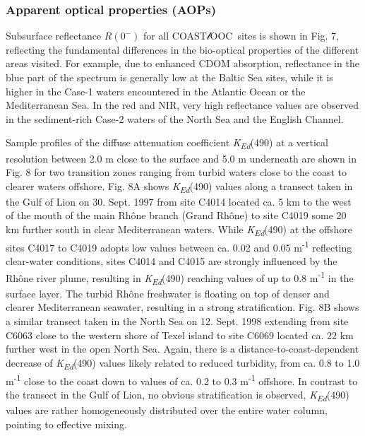\documentclass[essd, manuscript]{copernicus}
\newcommand{\coastlooc}{COAST$\mathscr{l}$OOC~\allowbreak}
\begin{document}
\subsubsection{Apparent optical properties (AOPs)}

Subsurface reflectance $R(0^-)$ for all \coastlooc sites is shown in Fig. 7, reflecting the fundamental differences in the bio-optical properties of the different areas visited. For example, due to enhanced CDOM absorption, reflectance in the blue part of the spectrum is generally low at the Baltic Sea sites, while it is higher in the Case-1 waters encountered in the Atlantic Ocean or the Mediterranean Sea. In the red and NIR, very high reflectance values are observed in the sediment-rich Case-2 waters of the North Sea and the English Channel.

Sample profiles of the diffuse attenuation coefficient \textit{K\textsubscript{Ed}}(490) at a vertical resolution between 2.0 m close to the surface and 5.0 m underneath are shown in Fig. 8 for two transition zones ranging from turbid waters close to the coast to clearer waters offshore. Fig. 8A shows \textit{K\textsubscript{Ed}}(490) values along a transect taken in the Gulf of Lion on 30. Sept. 1997 from site C4014 located ca. 5 km to the west of the mouth of the main Rhône branch (Grand Rhône) to site C4019 some 20 km further south in clear Mediterranean waters. While \textit{K\textsubscript{Ed}}(490) at the offshore sites C4017 to C4019 adopts low values between ca. 0.02 and 0.05 m\textsuperscript{-1} reflecting clear-water conditions, sites C4014 and C4015 are strongly influenced by the Rhône river plume, resulting in \textit{K\textsubscript{Ed}}(490) reaching values of up to 0.8 m\textsuperscript{-1} in the surface layer. The turbid Rhône freshwater is floating on top of denser and clearer Mediterranean seawater, resulting in a strong stratification. Fig. 8B shows a similar transect taken in the North Sea on 12. Sept. 1998 extending from site C6063 close to the western shore of Texel island to site C6069 located ca. 22 km further west in the open North Sea. Again, there is a distance-to-coast-dependent decrease of \textit{K\textsubscript{Ed}}(490) values likely related to reduced turbidity, from ca. 0.8 to 1.0 m\textsuperscript{-1} close to the coast down to values of ca. 0.2 to 0.3 m\textsuperscript{-1} offshore. In contrast to the transect in the Gulf of Lion, no obvious stratification is observed, \textit{K\textsubscript{Ed}}(490) values are rather homogeneously distributed over the entire water column, pointing to effective mixing.
\end{document}
